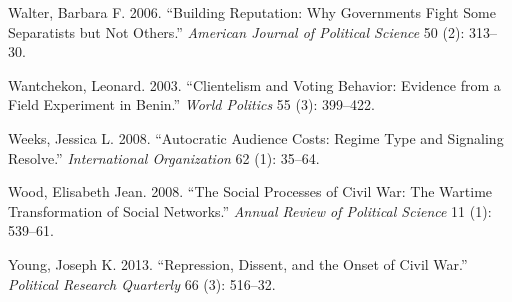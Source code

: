 \documentclass[12pt,]{article}
\theoremstyle{definition}
\theoremstyle{definition}
\theoremstyle{definition}
\theoremstyle{remark}
\begin{document}
\leavevmode\hypertarget{ref-Walter2006a}{}%
Walter, Barbara F. 2006. ``Building Reputation: Why Governments Fight
Some Separatists but Not Others.'' \emph{American Journal of Political
Science} 50 (2): 313--30.

\leavevmode\hypertarget{ref-Wantchekon2003}{}%
Wantchekon, Leonard. 2003. ``Clientelism and Voting Behavior: Evidence
from a Field Experiment in Benin.'' \emph{World Politics} 55 (3):
399--422.

\leavevmode\hypertarget{ref-Weeks2008}{}%
Weeks, Jessica L. 2008. ``Autocratic Audience Costs: Regime Type and
Signaling Resolve.'' \emph{International Organization} 62 (1): 35--64.

\leavevmode\hypertarget{ref-Wood2008a}{}%
Wood, Elisabeth Jean. 2008. ``The Social Processes of Civil War: The
Wartime Transformation of Social Networks.'' \emph{Annual Review of
Political Science} 11 (1): 539--61.

\leavevmode\hypertarget{ref-Young2013}{}%
Young, Joseph K. 2013. ``Repression, Dissent, and the Onset of Civil
War.'' \emph{Political Research Quarterly} 66 (3): 516--32.
\end{document}
